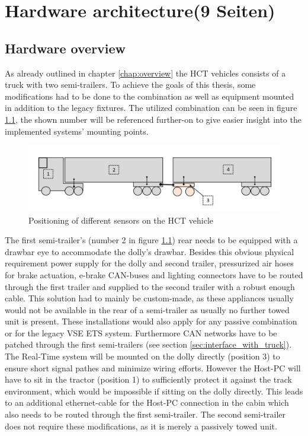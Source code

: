 \documentclass[ExampleMasters.tex]{subfiles}
\begin{document}
\clearpage
{\pagestyle{empty}\cleardoublepage}%


\chapter{Hardware architecture(9 Seiten)}
\label{chap:hardware_setup}

\section{Hardware overview}

As already outlined in chapter \ref{chap:overview} the \gls{HCT} vehicles consists of a truck with two semi-trailers. To achieve the goals of this thesis, some modifications had to be done to the combination as well as equipment mounted in addition to the legacy fixtures. The utilized combination can be seen in figure \ref{fig:combination_overview_with_positions}, the shown number will be referenced further-on to give easier insight into the implemented systems' mounting points.

\begin{figure}[!htb]
	\centering
	\includegraphics[width=1\linewidth]{figures/combination_overview_with_positions}
	\caption{Positioning of different sensors on the \gls{HCT} vehicle}
	\label{fig:combination_overview_with_positions}
\end{figure}


The first semi-trailer's (number 2 in figure \ref{fig:combination_overview_with_positions}) rear needs to be equipped with a drawbar eye to accommodate the dolly's drawbar. Besides this obvious physical requirement power supply for the dolly and second trailer, pressurized air hoses for brake actuation, e-brake CAN-buses and lighting connectors have to be routed through the first trailer and supplied to the second trailer with a robust enough cable. This solution had to mainly be custom-made, as these appliances usually would not be available in the rear of a semi-trailer as usually no further towed unit is present. These installations would also apply for any passive combination or for the legacy \gls{VSE} \gls{ETS} system. Furthermore \gls{CAN} networks have to be patched through the first semi-trailers (see section \ref{sec:interface_with_truck}). The Real-Time system will be mounted on the dolly directly (position 3) to ensure short signal pathes and minimize wiring efforts. However the Host-PC will have to sit in the tractor (position 1) to sufficiently protect it against the track environment, which would be impossible if sitting on the dolly directly. This leads to an additional ethernet-cable for the Host-PC connection in the cabin which also needs to be routed through the first semi-trailer. The second semi-trailer does not require these modifications, as it is merely a passively towed unit.
\end{document}
